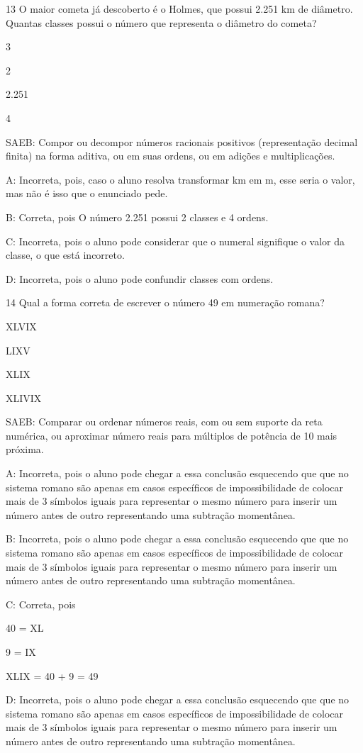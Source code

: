 {\num{13} O maior cometa já descoberto é o Holmes, que possui 2.251 km de
diâmetro. Quantas classes possui o número que representa o diâmetro do
cometa?
\item 3
\item 2
\item 2.251
\item 4

SAEB: Compor ou decompor números racionais positivos (representação
decimal finita) na forma aditiva, ou em suas ordens, ou em adições e
multiplicações.

A: Incorreta, pois, caso o aluno resolva transformar km em m, esse seria
o valor, mas não é isso que o enunciado pede.

B: Correta, pois O número 2.251 possui 2 classes e 4 ordens.

C: Incorreta, pois o aluno pode considerar que o numeral signifique o
valor da classe, o que está incorreto.

D: Incorreta, pois o aluno pode confundir classes com ordens.

\num{14} Qual a forma correta de escrever o número 49 em numeração romana?
\item XLVIX
\item LIXV
\item XLIX
\item XLIVIX

SAEB: Comparar ou ordenar números reais, com ou sem suporte da reta
numérica, ou aproximar número reais para múltiplos de potência de 10
mais próxima.

A: Incorreta, pois o aluno pode chegar a essa conclusão esquecendo que
que no sistema romano são apenas em casos específicos de impossibilidade
de colocar mais de 3 símbolos iguais para representar o mesmo número
para inserir um número antes de outro representando uma subtração
momentânea.

B: Incorreta, pois o aluno pode chegar a essa conclusão esquecendo que
que no sistema romano são apenas em casos específicos de impossibilidade
de colocar mais de 3 símbolos iguais para representar o mesmo número
para inserir um número antes de outro representando uma subtração
momentânea.

C: Correta, pois

40 = XL

9 = IX

XLIX = 40 + 9 = 49

D: Incorreta, pois o aluno pode chegar a essa conclusão esquecendo que
que no sistema romano são apenas em casos específicos de impossibilidade
de colocar mais de 3 símbolos iguais para representar o mesmo número
para inserir um número antes de outro representando uma subtração
momentânea.

}
